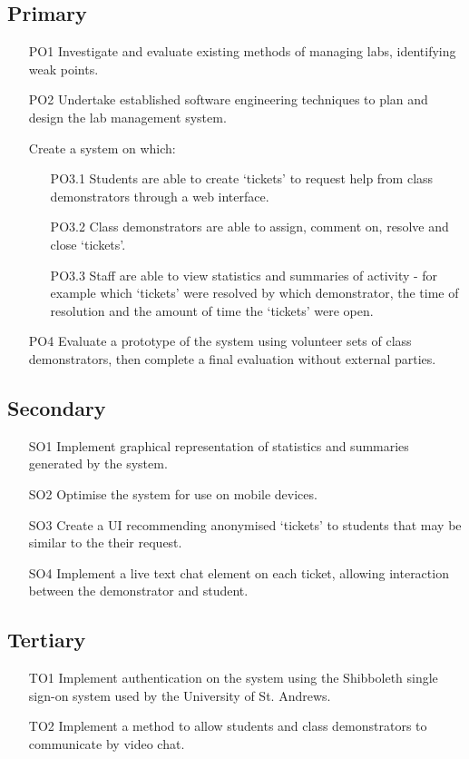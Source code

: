 \subsection{Primary}
\begin{itemize}
    \item [PO1] Investigate and evaluate existing methods of managing labs, identifying weak points.
    \item [PO2] Undertake established software engineering techniques to plan and design the lab management system.
    \item [] Create a system on which:
    \begin{itemize}
        \item [PO3.1] Students are able to create `tickets' to request help from class demonstrators through a web interface.
        \item [PO3.2] Class demonstrators are able to assign, comment on, resolve and close `tickets'.
        \item [PO3.3] Staff are able to view statistics and summaries of activity - for example which `tickets' were resolved by which demonstrator, the time of resolution and the amount of time the `tickets' were open.
    \end{itemize}
    \item [PO4] Evaluate a prototype of the system using volunteer sets of class demonstrators, then complete a final evaluation without external parties. 
    
\end{itemize}

\subsection{Secondary}
\begin{itemize}
    \item [SO1] Implement graphical representation of statistics and summaries generated by the system.
    \item [SO2] Optimise the system for use on mobile devices. 
    \item [SO3] Create a UI recommending anonymised `tickets' to students that may be similar to the their request.
    \item [SO4] Implement a live text chat element on each ticket, allowing interaction between the demonstrator and student.
\end{itemize}

\subsection{Tertiary}
\begin{itemize}
    \item [TO1] Implement authentication on the system using the Shibboleth single sign-on system used by the University of St. Andrews.
    \item [TO2] Implement a method to allow students and class demonstrators to communicate by video chat. 
\end{itemize}